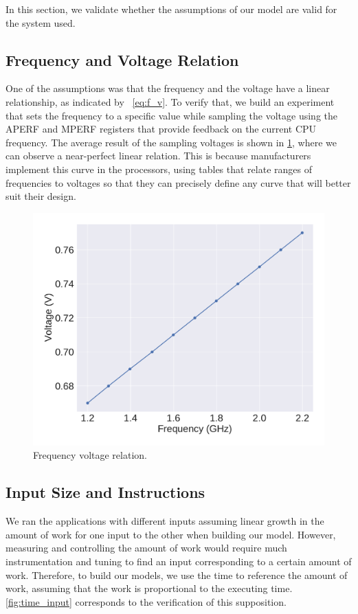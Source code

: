 In this section, we validate whether the assumptions of our model are valid for the system used.

\subsection{Frequency and Voltage Relation}
One of the assumptions was that the frequency and the voltage have a linear relationship, as indicated by ~\cref{eq:f_v}. To verify that, we build an experiment that sets the frequency to a specific value while sampling the voltage using the APERF and MPERF registers that provide feedback on the current CPU frequency. The average result of the sampling voltages is shown in  \cref{fig:freq_volt_rel}, where we can observe a near-perfect linear relation. This is because manufacturers implement this curve in the processors, using tables that relate ranges of frequencies to voltages so that they can precisely define any curve that will better suit their design.

\begin{figure}[H]
	\centering
	\captionsetup[subfigure]{justification=centering}
	\includegraphics[width=\columnwidth]{experiments/figures/freq_volt_rel.pdf}
	\caption{Frequency voltage relation.}
	\label{fig:freq_volt_rel}
\end{figure}

\subsection{Input Size and Instructions}
We ran the applications with different inputs assuming  linear growth in the amount of work for one input to the other when building our model. However, measuring and controlling the amount of work would require much instrumentation and tuning to find an input corresponding to a certain amount of work. Therefore, to build our models, we use the time to reference the amount of work, assuming that the work is proportional to the executing time. \cref{fig:time_input} corresponds to the verification of this supposition.


